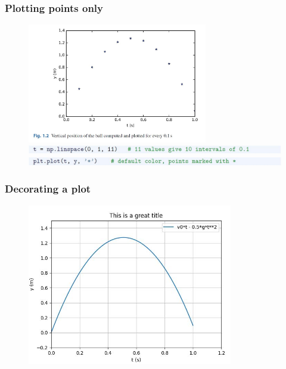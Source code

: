 \documentclass[14pt]{beamer}
\begin{document}
\begin{frame}[fragile]
\frametitle{Plotting points only}

\begin{figure}[ht]
	\centering
	\includegraphics[width=0.7\textwidth]{figures/LLp24a}
	\includegraphics[width=\textwidth]{figures/LLp23a}
	\includegraphics[width=\textwidth]{figures/LLp23b}
\end{figure}

\end{frame}


\begin{frame}[fragile]
\frametitle{Decorating a plot}

\vspace*{-3mm}
\begin{figure}[ht]
	\centering
	\includegraphics[width=0.8\textwidth]{figures/LLp24output}
\end{figure}

\end{frame}
\end{document}
